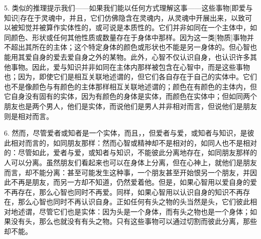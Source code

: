 5. 类似的推理提示我们——如果我们能以任何方式理解这事——这些事物[即爱与知识]存在于灵魂中，并且，它们仿佛隐含在灵魂内，从灵魂中开展出来，以致可以被知觉并被算作实体性的，或可说是本质性的。它们并非如同在一个主体中，如同颜色、形状或任何其他性质或数量存在于身体中那样。因为这一类[物质]事物并不超出其所在的主体；这个特定身体的颜色或形状也不能是另一身体的。但心智也能用其爱自身的爱去爱自身之外的某物。此外，心智不仅认识自身，也认识许多其他事物。因此，爱与知识并非如同在主体内那样被包含在心智中，而是这些事物也；因为，即使它们是相互关联地述谓的，但它们各自存在于自己的实体中。它们也不是像颜色与有颜色的主体那样相互关联地述谓的；颜色在有颜色的主体内，但它自身没有固有的实体，因为有颜色的身体是实体，而颜色在实体中；但如同两个朋友也是两个男人，他们是实体，而说他们是男人并非相对而言，但说他们是朋友则是相对而言。\par

6. 然而，尽管爱者或知者是一个实体，而且，，但爱者与爱，或知者与知识，是彼此相对而言的，如同朋友那样：然而心智或精神却不是相对的，如同人也不是相对的：尽管如此，爱者与爱，或知者与知识，不能彼此分离地存在，如同朋友那样的人可以分离。虽然朋友们看起来也可以在身体上分离，但在心神上，就他们是朋友而言，却不能分离：甚至可能发生这种事，一个朋友甚至开始恨另一个朋友，并因此不再是朋友，而另一方却不知道，仍然爱着他。但是，如果心智用以爱自身的爱不再存在，那么心智也同时不再爱。同样，如果心智用以认识自身的知识不再存在，那么心智也同时不再认识自身。正如任何有头之物的头当然是头，它们彼此相对地述谓，尽管它们也是实体：因为头是一个身体，而有头之物也是一个身体；如果没有头，那么也就没有有头之物。只有这些事物可以通过切割而彼此分离，那些却不能。\par

